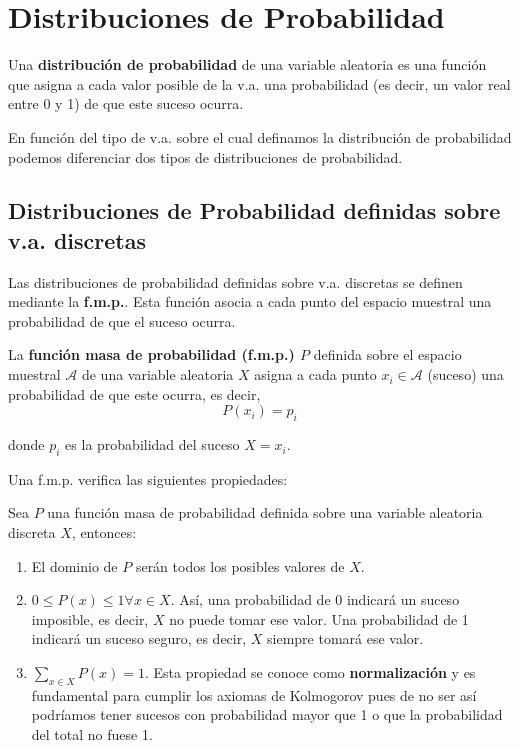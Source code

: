 \section{Distribuciones de Probabilidad}
Una \textbf{distribución de probabilidad} de una variable aleatoria es una función que asigna a cada valor posible de la \ac{v.a.} una probabilidad (es decir, un valor real entre 0 y 1) de que este suceso ocurra.

En función del tipo de \ac{v.a.} sobre el cual definamos la distribución de probabilidad podemos diferenciar dos tipos de distribuciones de probabilidad.

\subsection{Distribuciones de Probabilidad definidas sobre \ac{v.a.} discretas}
Las distribuciones de probabilidad definidas sobre \ac{v.a.} discretas se definen mediante la \textbf{\ac{f.m.p.}}. Esta función asocia a cada punto del espacio muestral una probabilidad de que el suceso ocurra.

\begin{definition}
    La \textbf{función masa de probabilidad (\ac{f.m.p.}) $P$} definida sobre el espacio muestral $\mathcal{A}$ de una variable aleatoria $X$ asigna a cada punto $x_i \in \mathcal{A}$ (suceso) una probabilidad de que este ocurra, es decir,
    \begin{equation}
        P(x_i) = p_i
    \end{equation}

    donde $p_i$ es la probabilidad del suceso $X=x_i$.
\end{definition}

Una \ac{f.m.p.} verifica las siguientes propiedades:
\begin{proposition}
    Sea $P$ una función masa de probabilidad definida sobre una variable aleatoria discreta $X$, entonces:
    \begin{enumerate}
        \item El dominio de $P$ serán todos los posibles valores de $X$.
        \item $0 \le P(x) \le 1 \forall x \in X$. Así, una probabilidad de 0 indicará un suceso imposible, es decir, $X$ no puede tomar ese valor. Una probabilidad de 1 indicará un suceso seguro, es decir, $X$ siempre tomará ese valor.
        \item $\sum_{x \in X}P(x) = 1$. Esta propiedad se conoce como \textbf{normalización} y es fundamental para cumplir los axiomas de Kolmogorov pues de no ser así podríamos tener sucesos con probabilidad mayor que 1 o que la probabilidad del total no fuese 1.
    \end{enumerate}
\end{proposition}


